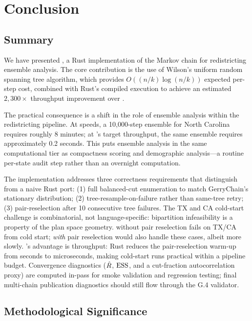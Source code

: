 \section{Conclusion}
\label{sec:conclusion}

\subsection{Summary}

We have presented \re{}, a Rust implementation of the \recom{} Markov
chain for redistricting ensemble analysis.
The core contribution is the use of Wilson's uniform random spanning tree
algorithm, which provides $O((n/k)\log(n/k))$ expected per-step cost,
combined with Rust's compiled execution to achieve an estimated
$2{,}300\times$ throughput improvement over \gc{}.

The practical consequence is a shift in the role of ensemble analysis
within the redistricting pipeline.
At \gc{} speeds, a 10{,}000-step ensemble for North Carolina requires
roughly 8 minutes; at \re{}'s target throughput, the same ensemble
requires approximately 0.2 seconds.
This puts ensemble analysis in the same computational tier as compactness
scoring and demographic analysis---a routine per-state audit step rather
than an overnight computation.

The implementation addresses three correctness requirements that
distinguish \re{} from a naive Rust port:
(1) full balanced-cut enumeration to match GerryChain's stationary
distribution;
(2) tree-resample-on-failure rather than same-tree retry;
(3) pair-reselection after 10 consecutive tree failures.
The TX and CA cold-start challenge is combinatorial, not language-specific:
bipartition infeasibility is a property of the plan space geometry.
\gc{} without pair reselection fails on TX/CA from cold start; \gc{}
\emph{with} pair reselection would also handle these cases, albeit more slowly.
\re{}'s advantage is throughput: Rust reduces the pair-reselection warm-up
from seconds to microseconds, making cold-start runs practical within a
pipeline budget.
Convergence diagnostics ($\hat{R}$, $\mathrm{ESS}$, and a cut-fraction
autocorrelation proxy) are computed in-pass for smoke validation and
regression testing; final multi-chain publication diagnostics should still
flow through the G.4 validator.

\subsection{Methodological Significance}


